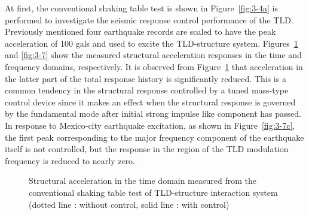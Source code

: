 At first, the conventional shaking table test is shown in Figure~\ref{fig:3-4a} is performed to investigate the seismic response control performance of the TLD. Previously mentioned four earthquake records are scaled to have the peak acceleration of 100 gals and used to excite the TLD-structure system. Figures~\ref{fig:3-6} and \ref{fig:3-7} show the measured structural acceleration responses in the time and frequency domains, respectively. It is observed from Figure~\ref{fig:3-6} that acceleration in the latter part of the total response history is significantly reduced. This is a common tendency in the structural response controlled by a tuned mass-type control device since it makes an effect when the structural response is governed by the fundamental mode after initial strong impulse like component has passed. In response to Mexico-city earthquake excitation, as shown in Figure~\ref{fig:3-7c}, the first peak corresponding to the major frequency component of the earthquake itself is not controlled, but the response in the region of the TLD modulation frequency is reduced to nearly zero.

\begin{figure}[!ht]
\centering
\caption{Structural acceleration in the time domain measured from the conventional shaking table test of TLD-structure interaction system (dotted line : without control, solid line : with control)}
\label{fig:3-6}
\end{figure}

